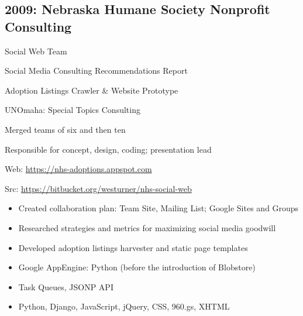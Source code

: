 \documentclass[letter,,openany,oneside]{sphinxhowto}
\begin{document}
\subsection{2009: Nebraska Humane Society Nonprofit Consulting}
\label{resume:id2}
\begin{DUlineblock}{0em}
\item[] Social Web Team
\item[] Social Media Consulting Recommendations Report
\item[] Adoption Listings Crawler \& Website Prototype
\item[] UNOmaha: Special Topics Consulting
\item[] Merged teams of six and then ten
\item[] Responsible for concept, design, coding; presentation lead
\item[] Web: \url{https://nhs-adoptions.appspot.com}
\item[] Src: \url{https://bitbucket.org/westurner/nhs-social-web}
\end{DUlineblock}
\begin{itemize}
\item {} 
Created collaboration plan: Team Site, Mailing List; Google Sites and Groups

\item {} 
Researched strategies and metrics for maximizing social media goodwill

\item {} 
Developed adoption listings harvester and static page templates

\item {} 
Google AppEngine: Python (before the introduction of Blobstore)

\item {} 
Task Queues, JSONP API

\item {} 
Python, Django, JavaScript, jQuery, CSS, 960.gs, XHTML

\end{itemize}
\end{document}
